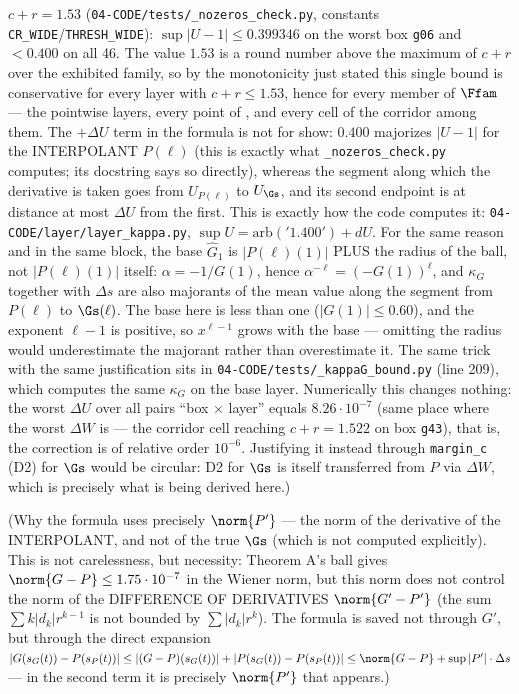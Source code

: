 $c+r = 1.53$ (\texttt{04-\allowbreak CODE/\allowbreak tests/\allowbreak \_\allowbreak nozeros\_\allowbreak check.py}, constants \texttt{CR\_WIDE}/\texttt{THRESH\_WIDE}):
$\sup|U-1| \le 0.399346$ on the worst box \texttt{g06} and $< 0.400$ on all 46.
The value $1.53$ is a round
number above the maximum of $c+r$ over the exhibited family, so by the monotonicity just stated this
single bound is conservative for every layer with $c+r \le 1.53$, hence for every member of
$\Ffam$ --- the pointwise layers, every point of
\Qcell, and every cell of the corridor among them.
The $+ \Delta U$ term in the formula is not for show: $0.400$ majorizes $|U-1|$ for the
INTERPOLANT $P(\ell)$ (this is exactly what \texttt{\_\allowbreak nozeros\_\allowbreak check.py} computes; its docstring says so
directly), whereas the segment along which the derivative is taken goes from $U_{P(\ell)}$ to $U_{\Gs}$,
and its second endpoint is at distance at most $\Delta U$ from the first. This is exactly how the code
computes it: \texttt{04-\allowbreak CODE/\allowbreak layer/\allowbreak layer\_\allowbreak kappa.py}, $\sup U = \text{arb}('1.400') + dU$. For the same reason and in
the same block, the base $\widehat{G}_{1}$ is $|P(\ell)(1)|$ PLUS the radius of the ball, not $|P(\ell)(1)|$ itself:
$\alpha = -1/G(1)$, hence $\alpha^{-\ell} = (-G(1))^{\ell}$, and $\kappa_G$ together with $\Delta s$ are also majorants of the
mean value along the segment from $P(\ell)$ to $\Gs(\ell)$. The base here is less than one ($|G(1)| \le 0.60$),
and the exponent $\ell-1$ is positive, so $x^{\ell-1}$ grows with the base --- omitting the radius would
underestimate the majorant rather than overestimate it. The same trick with the same justification
sits in \texttt{04-\allowbreak CODE/\allowbreak tests/\allowbreak \_\allowbreak kappaG\_\allowbreak bound.py} (line 209), which computes the same $\kappa_G$ on the base layer.
Numerically this changes nothing: the worst $\Delta U$ over all pairs ``box $\times$ layer'' equals $8.26\cdot 10^{-7}$
(same place where the worst $\Delta W$ is --- the corridor cell reaching $c+r = 1.522$ on box \texttt{g43}), that is,
the correction is of relative order $10^{-6}$. Justifying it instead through \texttt{margin\_c} (D2) for $\Gs$
would be circular: D2 for $\Gs$ is itself transferred from $P$ via $\Delta W$, which is precisely what
is being derived here.)

(Why the formula uses precisely $\norm{P'}$ --- the norm of the derivative of the INTERPOLANT,
and not of the true $\Gs$ (which is not computed explicitly). This is not carelessness,
but necessity: Theorem A's ball gives $\norm{G-P}\le 1.75\cdot 10^{-7}$ in the Wiener norm, but this norm
does not control the norm of the DIFFERENCE OF DERIVATIVES $\norm{G'-P'}$ (the sum
$\sum k|d_{k}|r^{k-1}$ is not bounded by $\sum|d_{k}|r^{k}$). The formula is saved not through $G'$,
but through the direct expansion
$|G(s_{G}(t))-P(s_{P}(t))| \le |(G-P)(s_{G}(t))| + |P(s_{G}(t))-P(s_{P}(t))| \le \norm{G-P} + \sup|P'|\cdot \Delta s$
--- in the second term it is precisely $\norm{P'}$ that appears.)

